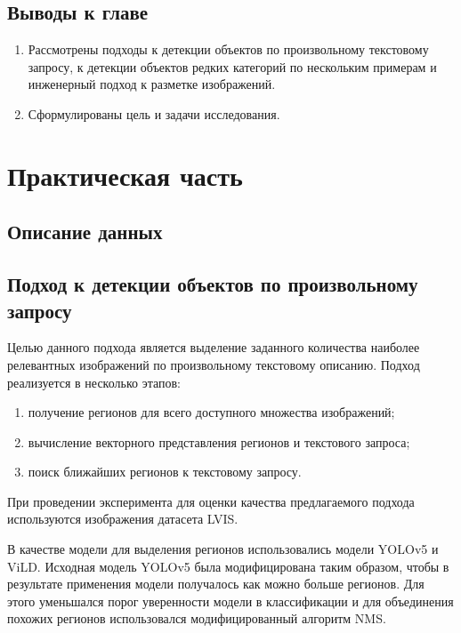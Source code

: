 \documentclass[a4paper,14pt]{article}
\begin{document}
    \subsection{Выводы к главе \thesection}
    \begin{enumerate}
        \itemsep0em
        \item Рассмотрены подходы к детекции объектов по произвольному текстовому запросу, к детекции объектов редких категорий по нескольким примерам и инженерный подход к разметке изображений.
        \item Сформулированы цель и задачи исследования.
    \end{enumerate}

    \newpage


    \section{Практическая часть}

    \subsection{Описание данных}

    \subsection{Подход к детекции объектов по произвольному запросу}

    Целью данного подхода является выделение заданного количества наиболее релевантных изображений по произвольному текстовому описанию.
    Подход реализуется в несколько этапов:
    \begin{enumerate}
        [1)]
        \itemsep0em
        \item получение регионов для всего доступного множества изображений;
        \item вычисление векторного представления регионов и текстового запроса;
        \item поиск ближайших регионов к текстовому запросу.
    \end{enumerate}

    При проведении эксперимента для оценки качества предлагаемого подхода используются изображения датасета LVIS.

    В качестве модели для выделения регионов использовались модели YOLOv5 и ViLD.
    Исходная модель YOLOv5 была модифицирована таким образом, чтобы в результате применения модели получалось как можно больше регионов.
    Для этого уменьшался порог уверенности модели в классификации и для объединения похожих регионов использовался модифицированный алгоритм NMS.
\end{document}

